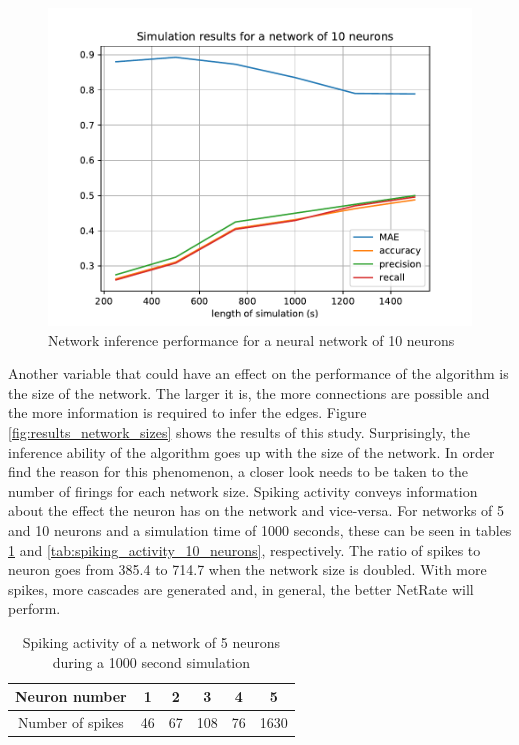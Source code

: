 \begin{figure}
	\centering
	\includegraphics[width=0.8\linewidth]{results_10_neurons.pdf}
	\caption{Network inference performance for a neural network of 10 neurons}
	\label{fig:results_10_neurons}
\end{figure}

Another variable that could have an effect on the performance of the algorithm is the size of the network. The larger it is, the more connections are possible and the more information is required to infer the edges. Figure \ref{fig:results_network_sizes} shows the results of this study. Surprisingly, the inference ability of the algorithm goes up with the size of the network. In order find the reason for this phenomenon, a closer look needs to be taken to the number of firings for each network size. Spiking activity conveys information about the effect the neuron has on the network and vice-versa. For networks of 5 and 10 neurons and a simulation time of 1000 seconds, these can be seen in tables \ref{tab:spiking_activity_5_neurons} and \ref{tab:spiking_activity_10_neurons}, respectively. The ratio of spikes to neuron goes from 385.4 to 714.7 when the network size is doubled. With more spikes, more cascades are generated and, in general, the better NetRate will perform.\\

\begin{table}[]
\centering
\begin{tabular}{|c|c|c|c|c|c|}
\hline
Neuron number    & 1  & 2  & 3   & 4  & 5    \\ \hline
Number of spikes & 46 & 67 & 108 & 76 & 1630 \\ \hline
\end{tabular}
\caption{Spiking activity of a network of 5 neurons during a 1000 second simulation}
\label{tab:spiking_activity_5_neurons}
\end{table}

